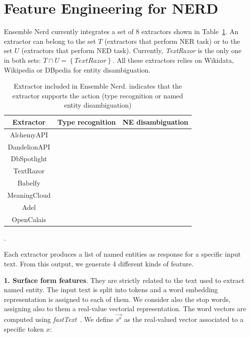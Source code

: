 \documentclass{llncs}
\newcommand{\cmark}{\ding{51}}
\newcommand{\xmark}{\ding{55}}
\newcommand{\tabref}[1]{\mbox{Table~\ref{#1}}}
\begin{document}

\section{Feature Engineering for NERD}
\label{sec:study}
Ensemble Nerd currently integrates a set of 8 extractors shown in \tabref{tab:exout}. An extractor can belong to the set $T$ (extractors that perform NER task) or to the set $U$ (extractors that perform NED task). Currently, \textit{TextRazor} is the only one in both sets: $T \cap U = \left \{  TextRazor \right \}$. All these extractors relies on Wikidata, Wikipedia or DBpedia for entity disambiguation.
 
\begin{table}[b]
\centering
\label{tab:exout}
\begin{tabular}{|c|c|c|}
\hline
\textbf{Extractor} & \textbf{Type recognition} & \textbf{NE disambiguation} \\ \hline
AlchemyAPI    & \cmark  & \xmark \\ \hline
DandelionAPI  & \xmark  & \cmark \\ \hline
DbSpotlight   & \xmark  & \cmark \\ \hline
TextRazor     & \cmark  & \cmark \\ \hline
Babelfy       & \xmark  & \cmark \\ \hline
MeaningCloud  & \cmark  & \xmark \\ \hline
Adel          & \cmark  & \xmark \\ \hline
OpenCalais    & \cmark  & \xmark \\ \hline
\end{tabular}
\bigskip
\caption{Extractor included in Ensemble Nerd. \cmark{ }indicates that the extractor supports the action (type recognition or named entity disambiguation)}.
\end{table}

Each extractor produces a list of named entities as response for a specific input text. From this output, we generate 4 different kinds of feature.

\textbf{1. Surface form features}. They are strictly related to the text used to extract named entity. The input text is split into tokens and a word embedding representation is assigned to each of them. We consider also the stop words, assigning also to them a real-value vectorial representation.
The word vectors are computed using \textit{fastText}~\cite{fasttext}. We define $\vec{s^{x}}$ as the real-valued vector associated to a specific token $x$:
\end{document}
